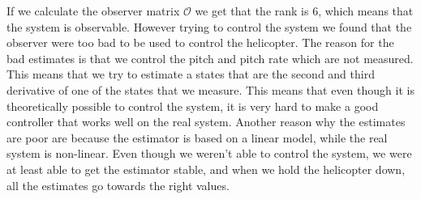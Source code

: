 If we calculate the observer matrix $\mathcal{O}$ we get that the rank is 6, which means that the system is observable. However trying to control the system we found that the observer were too bad to be used to control the helicopter. The reason for the bad estimates is that we control the pitch and pitch rate which are not measured. This means that we try to estimate a states that are the second and third derivative of one of the states that we measure. This means that even though it is theoretically possible to control the system, it is very hard to make a good controller that works well on the real system. Another reason why the estimates are poor are because the estimator is based on a linear model, while the real system is non-linear. Even though we weren't able to control the system, we were at least able to get the estimator stable, and when we hold the helicopter down, all the estimates go towards the right values.